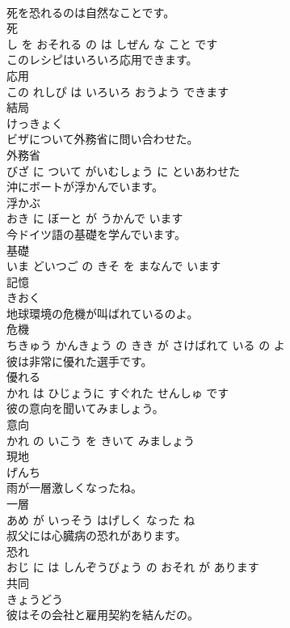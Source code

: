 \documentclass[8pt]{extreport}
\begin{document}
\begin{CJK}{UTF8}{min}
\\	死を恐れるのは自然なことです。	
\\	死 
\\	し を おそれる の は しぜん な こと です			
\\	このレシピはいろいろ応用できます。	
\\	応用 
\\	この れしぴ は いろいろ おうよう できます			
\\	結局	
\\	けっきょく			
\\	ビザについて外務省に問い合わせた。	
\\	外務省 
\\	びざ に ついて がいむしょう に といあわせた			
\\	沖にボートが浮かんでいます。	
\\	浮かぶ 
\\	おき に ぼーと が うかんで います			
\\	今ドイツ語の基礎を学んでいます。	
\\	基礎 
\\	いま どいつご の きそ を まなんで います			
\\	記憶	
\\	きおく			
\\	地球環境の危機が叫ばれているのよ。	
\\	危機 
\\	ちきゅう かんきょう の きき が さけばれて いる の よ			
\\	彼は非常に優れた選手です。	
\\	優れる 
\\	かれ は ひじょうに すぐれた せんしゅ です			
\\	彼の意向を聞いてみましょう。	
\\	意向 
\\	かれ の いこう を きいて みましょう			
\\	現地	
\\	げんち			
\\	雨が一層激しくなったね。	
\\	一層 
\\	あめ が いっそう はげしく なった ね			
\\	叔父には心臓病の恐れがあります。	
\\	恐れ 
\\	おじ に は しんぞうびょう の おそれ が あります			
\\	共同	
\\	きょうどう			
\\	彼はその会社と雇用契約を結んだの。	

\end{CJK}
\end{document}
